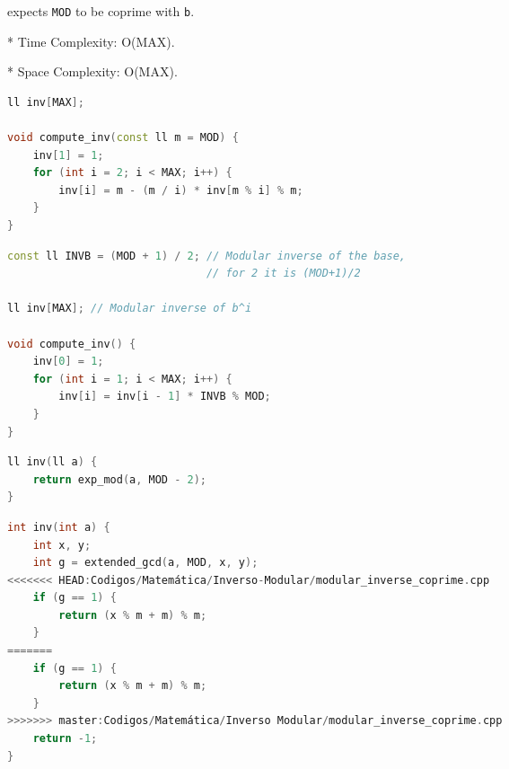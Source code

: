 \documentclass[11pt, a4paper, oneside]{book}
\begin{document}
expects \lstinline{MOD} to be coprime with \lstinline{b}.



* Time Complexity: O(MAX).

* Space Complexity: O(MAX).

\hfill

\begin{multicols}{2}
\begin{lstlisting}[language=C++]
ll inv[MAX];

void compute_inv(const ll m = MOD) {
    inv[1] = 1;
    for (int i = 2; i < MAX; i++) {
        inv[i] = m - (m / i) * inv[m % i] % m;
    }
}
\end{lstlisting}
\end{multicols}

\hfill

\begin{multicols}{2}
\begin{lstlisting}[language=C++]
const ll INVB = (MOD + 1) / 2; // Modular inverse of the base,
                               // for 2 it is (MOD+1)/2

ll inv[MAX]; // Modular inverse of b^i

void compute_inv() {
    inv[0] = 1;
    for (int i = 1; i < MAX; i++) {
        inv[i] = inv[i - 1] * INVB % MOD;
    }
}
\end{lstlisting}
\end{multicols}

\hfill

\begin{multicols}{2}
\begin{lstlisting}[language=C++]
ll inv(ll a) {
    return exp_mod(a, MOD - 2);
}
\end{lstlisting}
\end{multicols}

\hfill

\begin{multicols}{2}
\begin{lstlisting}[language=C++]
int inv(int a) {
    int x, y;
    int g = extended_gcd(a, MOD, x, y);
<<<<<<< HEAD:Codigos/Matemática/Inverso-Modular/modular_inverse_coprime.cpp
    if (g == 1) {
        return (x % m + m) % m;
    }
=======
    if (g == 1) {
        return (x % m + m) % m;
    }
>>>>>>> master:Codigos/Matemática/Inverso Modular/modular_inverse_coprime.cpp
    return -1;
}
\end{lstlisting}
\end{multicols}

\hfill
\end{document}
